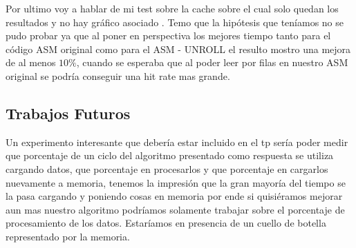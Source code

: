 Por ultimo voy a hablar de mi test sobre la cache sobre el cual solo quedan los resultados y no hay gráfico asociado . Temo que la  hipótesis que teníamos no se pudo probar ya que al poner en perspectiva los mejores tiempo tanto para el código ASM original como para el ASM - UNROLL el resulto mostro una mejora de al menos $10\%$, cuando se esperaba que al poder leer por filas en nuestro ASM original se podría conseguir una hit rate mas grande. 

\subsection{Trabajos Futuros}
Un experimento interesante que debería estar incluido en el tp sería poder medir que porcentaje de un ciclo del algoritmo presentado como respuesta se utiliza cargando datos, que porcentaje en procesarlos y que porcentaje en cargarlos nuevamente a memoria, tenemos la impresión que la gran mayoría del tiempo se la pasa cargando y poniendo cosas en memoria por ende si quisiéramos mejorar aun mas nuestro algoritmo podríamos solamente trabajar sobre el porcentaje de procesamiento de los datos. Estaríamos en presencia de un cuello de botella representado por la memoria.

